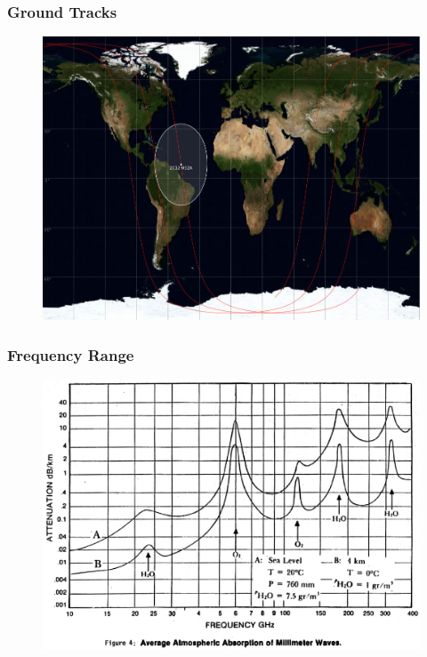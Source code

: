 \documentclass[12pt,utf8,notheorems,compress]{beamer}
\begin{document}
\begin{frame}
  \frametitle{Ground Tracks}
  \pause
  \begin{figure}[!ht]
    \centering
    \includegraphics[width=\textwidth]{ground-track.jpg}
  \end{figure}
\end{frame}

\begin{frame}
  \frametitle{Frequency Range}
  \pause
  \begin{figure}[!ht]
    \centering
    \includegraphics[width=\textwidth]{atmosphere-spectrum.png}
  \end{figure}
\end{frame}
\end{document}
